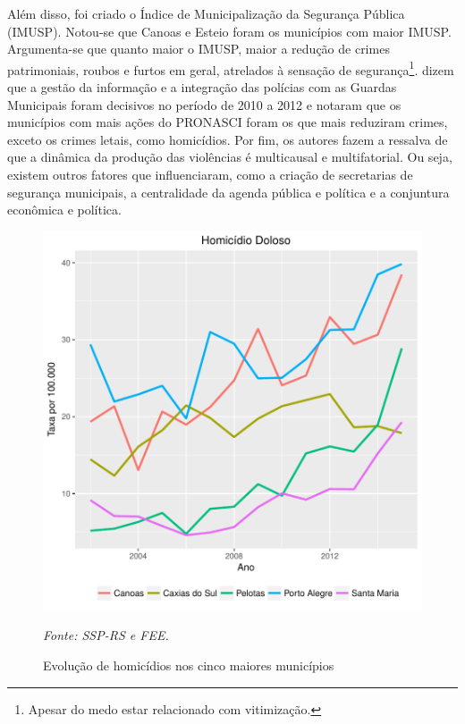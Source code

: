 \documentclass[12pt,openright,oneside,a4paper,english,french,spanish]{abntex2}
\numberwithin{table}{section} %
\numberwithin{figure}{section} %
\newcommand{\co}{\citeonline}
\newcommand{\source}[1]{\textit{#1}}
\begin{document}
Além disso, foi criado o Índice de Municipalização da Segurança Pública (IMUSP). Notou-se que Canoas e Esteio foram os municípios com maior IMUSP. Argumenta-se que quanto maior o IMUSP, maior a redução de crimes patrimoniais, roubos e furtos em geral, atrelados à sensação de segurança\footnote{Apesar do medo estar relacionado com vitimização.}. \co{kerber2016} dizem que a gestão da informação e a integração das polícias com as Guardas Municipais foram decisivos no período de 2010 a 2012 e notaram que os municípios com mais ações do PRONASCI foram os que mais reduziram crimes, exceto os crimes letais, como homicídios. Por fim, os autores fazem a ressalva de que a dinâmica da produção das violências é multicausal e multifatorial. Ou seja, existem outros fatores que influenciaram, como a criação de secretarias de segurança municipais, a centralidade da agenda pública e política e a conjuntura econômica e política.

\begin{figure}
\begin{center}
\includegraphics{TESE_DE_DOUTORADO_RENAN_FINAL-plot5}
\end{center}
\caption{Evolução de homicídios nos cinco maiores municípios}
\source{Fonte: SSP-RS e FEE.}
\label{fig:hom_dol5}
\end{figure}
\end{document}
